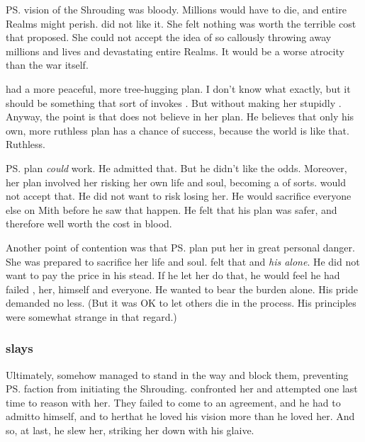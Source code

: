 \ps{\Ishnaruchaefir} vision of the Shrouding was bloody. 
Millions would have to die, and entire Realms might perish. 
\Rystessakhin{} did not like it. 
She felt nothing was worth the terrible cost that \Ishnaruchaefir{} proposed. 
She could not accept the idea of so callously throwing away millions and lives and devastating entire Realms. 
It would be a worse atrocity than the war itself. 

\Rystessakhin{} had a more peaceful, more tree-hugging plan. 
I don't know what exactly, but it should be something that sort of invokes . 
But without making her stupidly . 
Anyway, the point is that \Ishnaruchaefir{} does not believe in her plan. 
He believes that only his own, more ruthless plan has a chance of success, because the world is like that. 
Ruthless. 

\ps{\Rystessakhin} plan \emph{could} work. 
He admitted that. 
But he didn't like the odds. 
Moreover, her plan involved her risking her own life and soul, becoming a  of sorts. 
\Ishnaruchaefir{} would not accept that. 
He did not want to risk losing her.
He would sacrifice everyone else on Mith before he saw that happen. 
He felt that his plan was safer, and therefore well worth the cost in blood. 

Another point of contention was that \ps{\Rystessakhin} plan put her in great personal danger. 
She was prepared to sacrifice her life and soul. 
\Ishnaruchaefir{} felt that  and \emph{his alone}. 
He did not want \Rystessakhin{} to pay the price in his stead. 
If he let her do that, he would feel he had failed \Nexagglachel, her, himself and everyone. 
He wanted to bear the burden alone. 
His pride demanded no less. 
(But it was OK to let others die in the process. 
His principles were somewhat strange in that regard.)





\subsubsection{\Ishnaruchaefir{} slays \Rystessakhin}
Ultimately, \Rystessakhin{} somehow managed to stand in the way and block them, preventing \ps{\Ishnaruchaefir} faction from initiating the Shrouding. 
\Ishnaruchaefir{} confronted her and attempted one last time to reason with her. 
They failed to come to an agreement, and he had to admit\dash to himself, and to her\dash that he loved his vision more than he loved her. 
And so, at last, he slew her, striking her down with his glaive.

